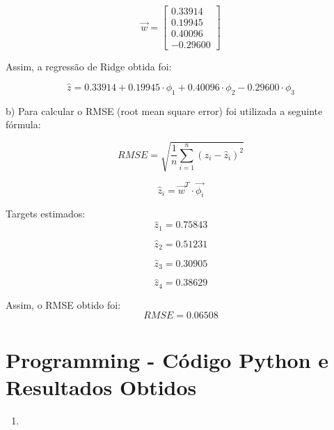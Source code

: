 \documentclass[a4paper,12pt]{article} %
\begin{document}
\begin{enumerate}
\begin{equation*}
    \vec{w} = \begin{bmatrix}  0.33914 \\ 0.19945 \\ 0.40096 \\ -0.29600 \end{bmatrix}
\end{equation*}

Assim, a regressão de Ridge obtida foi:

\begin{equation*}  
    \hat{z} = 0.33914 + 0.19945 \cdot \phi_1 + 0.40096 \cdot \phi_2 - 0.29600 \cdot \phi_3
\end{equation*}

b)
Para calcular o RMSE (root mean square error) foi utilizada a seguinte fórmula:

\begin{equation}
    RMSE = \sqrt{\frac{1}{n} \sum_{i=1}^{n} (z_i - \hat{z}_i)^2}
\end{equation}

\begin{equation}
    \hat{z}_i = \vec{w}^T \cdot \vec{\phi_i}
\end{equation}
 
Targets estimados:
\begin{equation*}
    \hat{z}_1 = 0.75843
\end{equation*}

\begin{equation*}
    \hat{z}_2 = 0.51231
\end{equation*}

\begin{equation*}
    \hat{z}_3 = 0.30905
\end{equation*}

\begin{equation*}
    \hat{z}_4 = 0.38629
\end{equation*}

Assim, o RMSE obtido foi:
\begin{equation*}
    RMSE = 0.06508
\end{equation*}

\end{enumerate}

\clearpage
\section*{Programming - Código Python e Resultados Obtidos}

\begin{enumerate}
\item 

\end{enumerate}
\end{document}
